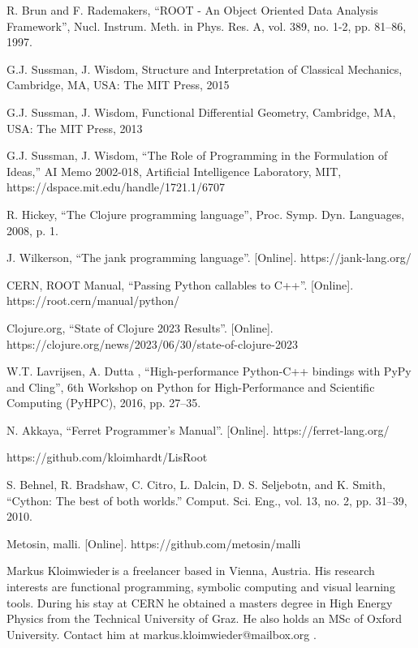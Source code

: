 \documentclass{IEEEcsmag}
\begin{document}
\begin{thebibliography}{1}
R. Brun and F. Rademakers, “ROOT - An Object Oriented Data Analysis Framework”, Nucl. Instrum. Meth. in Phys. Res. A, vol. 389, no. 1-2, pp. 81–86, 1997.

G.J. Sussman, J. Wisdom, Structure and Interpretation of Classical Mechanics, Cambridge, MA, USA: The MIT Press, 2015

G.J. Sussman, J. Wisdom, Functional Differential Geometry, Cambridge, MA, USA: The MIT Press, 2013

G.J. Sussman, J. Wisdom, “The Role of Programming in the Formulation of Ideas,” AI Memo 2002-018, Artificial Intelligence Laboratory, MIT, https://dspace.mit.edu/handle/1721.1/6707

R. Hickey, “The Clojure programming language”, Proc. Symp. Dyn. Languages, 2008, p. 1.

J. Wilkerson, “The jank programming language”. [Online]. https://jank-lang.org/

CERN, ROOT Manual, “Passing Python callables to C++”. [Online]. https://root.cern/manual/python/

Clojure.org, “State of Clojure 2023 Results”. [Online]. https://clojure.org/news/2023/06/30/state-of-clojure-2023

W.T. Lavrijsen, A. Dutta , “High-performance Python-C++ bindings with PyPy and Cling”, 6th Workshop on Python for High-Performance and Scientific Computing (PyHPC), 2016, pp. 27–35.

N. Akkaya, “Ferret Programmer's Manual”. [Online]. https://ferret-lang.org/

https://github.com/kloimhardt/LisRoot

S. Behnel,  R. Bradshaw, C. Citro, L. Dalcin, D. S. Seljebotn, and K. Smith, “Cython: The best of both worlds.” Comput. Sci. Eng., vol. 13, no. 2, pp. 31–39, 2010.

Metosin, malli. [Online]. https://github.com/metosin/malli
\end{thebibliography}\vspace*{-8pt}

\begin{IEEEbiography}{Markus Kloimwieder}{\,}is a freelancer based in Vienna, Austria. His research interests are functional programming, symbolic computing and visual learning tools. During his stay at CERN he obtained a masters degree in High Energy Physics from the Technical University of Graz. He also holds an MSc of Oxford University. Contact him at markus.kloimwieder@mailbox.org .
\end{IEEEbiography}
\end{document}
